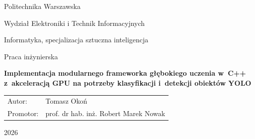 \documentclass[12pt,a4paper,oneside]{report}
\newcommand{\thesisinput}[1]{}%
\newcommand{\thesisinput}[1]{}%
\newcommand{\tytulpracy}{Implementacja modularnego frameworka głębokiego uczenia w~C++ z~akceleracją GPU na potrzeby klasyfikacji i~detekcji obiektów YOLO}
\newcommand{\uczelnia}{Politechnika Warszawska}
\newcommand{\wydzial}{Wydział Elektroniki i Technik Informacyjnych}
\newcommand{\kierunek}{Informatyka, specjalizacja sztuczna inteligencja}
\newcommand{\autorpracy}{Tomasz Okoń}
\newcommand{\promotorpracy}{prof. dr hab. inż. Robert Marek Nowak}
\begin{document}
\begin{titlepage}
  \centering
  {\large\uczelnia\par}
  \vspace{0.35cm}
  {\large\wydzial\par}
  \vspace{0.25cm}
  {\large\kierunek\par}
  \vspace{2.2cm}
  {\Large Praca inżynierska\par}
  \vspace{1.8cm}
  {\LARGE\bfseries \tytulpracy\par}
  \vspace{2cm}
  \begin{tabular}{@{}ll@{}}
    Autor: & \autorpracy \\[0.7em]
    Promotor: & \promotorpracy \\
  \end{tabular}
  \vfill
  {\large 2026\par}
\end{titlepage}

\tableofcontents
\clearpage

\thesisinput{front/wykaz_skrotow}

\thesisinput{chapters/01_wstep}
\thesisinput{chapters/02_podstawy_teoretyczne}
\thesisinput{chapters/03_architektura_i_implementacja}
\thesisinput{chapters/04_metodologia_i_benchmarki}
\thesisinput{chapters/05_wnioski}

\thesisinput{back/bibliografia}

\listoftables

\thesisinput{back/zalaczniki}
\end{document}
